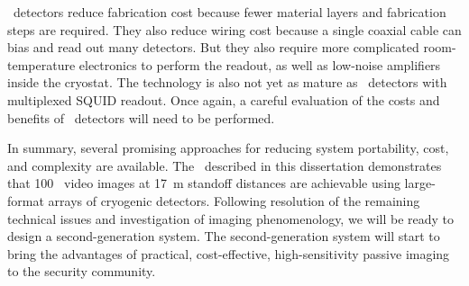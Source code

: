 \MKID\ detectors reduce fabrication cost because fewer material layers and fabrication steps are required.
They also reduce wiring cost because a single coaxial cable can bias and read out many detectors.
But they also require more complicated room-temperature electronics to perform the readout, as well as low-noise amplifiers inside the cryostat.
The technology is also not yet as mature as \TES\ detectors with multiplexed SQUID readout.
Once again, a careful evaluation of the costs and benefits of \MKID\ detectors will need to be performed.

In summary, several promising approaches for reducing system portability, cost, and complexity are available.
The \Imager\ described in this dissertation demonstrates that \SI{100}{\mK} \NETD\ video images at \SI{17}{\m} standoff distances are achievable using large-format arrays of cryogenic detectors.
Following resolution of the remaining technical issues and investigation of imaging phenomenology, we will be ready to design a second-generation system.
The second-generation system will start to bring the advantages of practical, cost-effective, high-sensitivity passive imaging to the security community.
